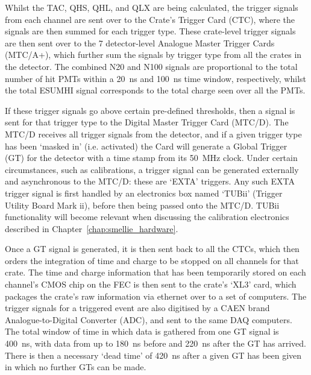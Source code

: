 Whilst the TAC, QHS, QHL, and QLX are being calculated, the trigger signals from each channel are sent over to the Crate's Trigger Card (CTC), where the signals are then summed for each trigger type. These crate-level trigger signals are then sent over to the 7 detector-level Analogue Master Trigger Cards (MTC/A+), which further sum the signals by trigger type from all the crates in the detector. The combined N20 and N100 signals are proportional to the total number of hit PMTs within a \SI{20}{\ns} and \SI{100}{\ns} time window, respectively, whilst the total ESUMHI signal corresponds to the total charge seen over all the PMTs.

If these trigger signals go above certain pre-defined thresholds, then a signal is sent for that trigger type to the Digital Master Trigger Card (MTC/D). The MTC/D receives all trigger signals from the detector, and if a given trigger type has been `masked in' (i.e. activated) the Card will generate a Global Trigger (GT) for the detector with a time stamp from its \SI{50}{\MHz} clock. Under certain circumstances, such as calibrations, a trigger signal can be generated externally and asynchronous to the MTC/D: these are `EXTA' triggers. Any such EXTA trigger signal is first handled by an electronics box named `TUBii' (Trigger Utility Board Mark ii), before then being passed onto the MTC/D. TUBii functionality will become relevant when discussing the calibration electronics described in Chapter~\ref{chap:smellie_hardware}.

Once a GT signal is generated, it is then sent back to all the CTCs, which then orders the integration of time and charge to be stopped on all channels for that crate. The time and charge information that has been temporarily stored on each channel's CMOS chip on the FEC is then sent to the crate's `XL3' card, which packages the crate's raw information via ethernet over to a set of computers. The trigger signals for a triggered event are also digitised by a CAEN brand Analogue-to-Digital Converter (ADC), and sent to the same DAQ computers. The total window of time in which data is gathered from one GT signal is \SI{400}{\ns}, with data from up to \SI{180}{\ns} before and \SI{220}{\ns} after the GT has arrived. There is then a necessary `dead time' of \SI{420}{\ns} after a given GT has been given in which no further GTs can be made.

